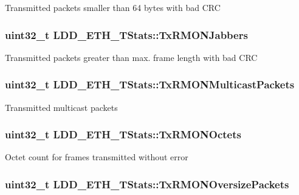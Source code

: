 Transmitted packets smaller than 64 bytes with bad C\-R\-C \hypertarget{struct_l_d_d___e_t_h___t_stats_a30c4fb9b3030a0b5c4da891b36d69a76}{
\subsubsection[{Tx\-R\-M\-O\-N\-Jabbers}]{\setlength{\rightskip}{0pt plus 5cm}uint32\-\_\-t L\-D\-D\-\_\-\-E\-T\-H\-\_\-\-T\-Stats\-::\-Tx\-R\-M\-O\-N\-Jabbers}}\label{struct_l_d_d___e_t_h___t_stats_a30c4fb9b3030a0b5c4da891b36d69a76}
Transmitted packets greater than max. frame length with bad C\-R\-C \hypertarget{struct_l_d_d___e_t_h___t_stats_a2b325527389430d30afecb85c2c14f52}{
\subsubsection[{Tx\-R\-M\-O\-N\-Multicast\-Packets}]{\setlength{\rightskip}{0pt plus 5cm}uint32\-\_\-t L\-D\-D\-\_\-\-E\-T\-H\-\_\-\-T\-Stats\-::\-Tx\-R\-M\-O\-N\-Multicast\-Packets}}\label{struct_l_d_d___e_t_h___t_stats_a2b325527389430d30afecb85c2c14f52}
Transmitted multicast packets \hypertarget{struct_l_d_d___e_t_h___t_stats_ab6fa31abe9d10fa54a542dafd9f64fe9}{
\subsubsection[{Tx\-R\-M\-O\-N\-Octets}]{\setlength{\rightskip}{0pt plus 5cm}uint32\-\_\-t L\-D\-D\-\_\-\-E\-T\-H\-\_\-\-T\-Stats\-::\-Tx\-R\-M\-O\-N\-Octets}}\label{struct_l_d_d___e_t_h___t_stats_ab6fa31abe9d10fa54a542dafd9f64fe9}
Octet count for frames transmitted without error \hypertarget{struct_l_d_d___e_t_h___t_stats_a4471a4a6cf8f3d3bbbff52874643a64d}{
\subsubsection[{Tx\-R\-M\-O\-N\-Oversize\-Packets}]{\setlength{\rightskip}{0pt plus 5cm}uint32\-\_\-t L\-D\-D\-\_\-\-E\-T\-H\-\_\-\-T\-Stats\-::\-Tx\-R\-M\-O\-N\-Oversize\-Packets}}\label{struct_l_d_d___e_t_h___t_stats_a4471a4a6cf8f3d3bbbff52874643a64d}
